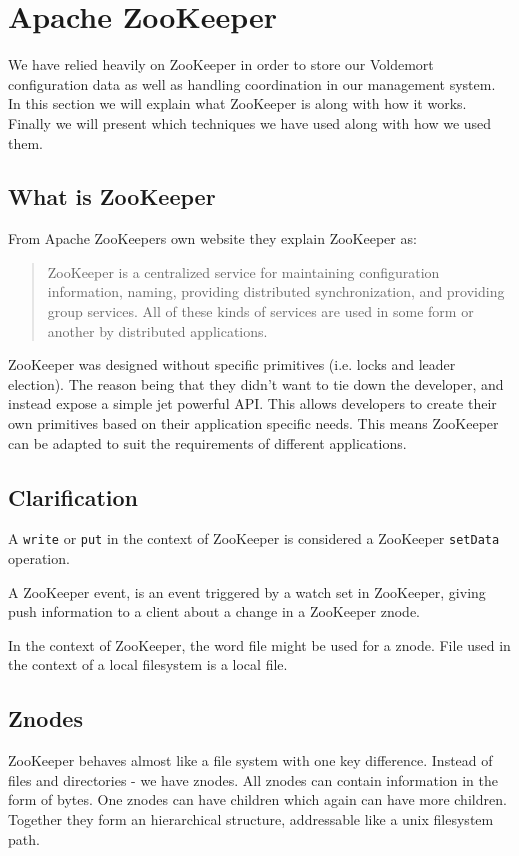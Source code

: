 \clearpage
\section{Apache ZooKeeper}
\label{sec:zookeeper}
We have relied heavily on ZooKeeper in order to store our Voldemort configuration data as well as handling coordination in our management system. In this section we will explain what ZooKeeper is along with how it works. Finally we will present which techniques we have used along with how we used them. 

\subsection{What is ZooKeeper}
From Apache ZooKeepers own website\cite{zookeeper} they explain ZooKeeper as:

\blockquote{ZooKeeper is a centralized service for maintaining configuration information, naming, providing distributed synchronization, and providing group services. All of these kinds of services are used in some form or another by distributed applications.}

ZooKeeper was designed without specific primitives (i.e. locks and leader election). The reason being that they didn't want to tie down the developer, and instead expose a simple jet powerful API. This allows developers to create their own primitives based on their application specific needs. This means ZooKeeper can be adapted to suit the requirements of different applications. 

\subsection{Clarification}
A \texttt{write} or \texttt{put} in the context of ZooKeeper is considered a ZooKeeper \texttt{setData} operation.

A ZooKeeper event, is an event triggered by a watch set in ZooKeeper, giving push information to a client about a change in a ZooKeeper znode.

In the context of ZooKeeper, the word file might be used for a znode. File used in the context of a local filesystem is a local file.

\subsection{Znodes}
ZooKeeper behaves almost like a file system with one key difference. Instead of files and directories - we have znodes. All znodes can contain information in the form of bytes. One znodes can have children which again can have more children. Together they form an hierarchical structure, addressable like a unix filesystem path. 

